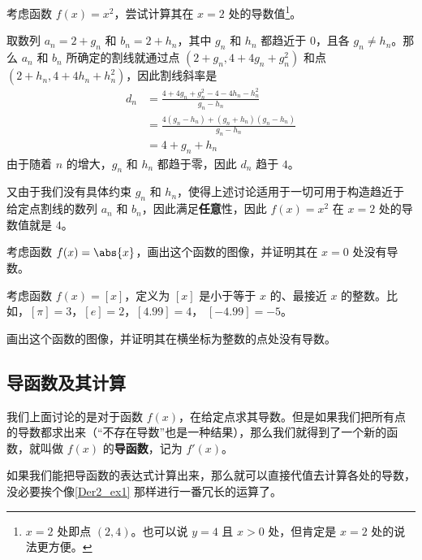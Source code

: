 \begin{example}{}\label{Der2_ex1}
考虑函数 $f(x)=x^2$，尝试计算其在 $x=2$ 处的导数值\footnote{$x=2$ 处即点 $(2, 4)$。也可以说 $y=4$ 且 $x>0$ 处，但肯定是 $x=2$ 处的说法更方便。}。

取数列 $a_n=2+g_n$ 和 $b_n=2+h_n$，其中 $g_n$ 和 $h_n$ 都趋近于 $0$，且各 $g_n\not=h_n$。那么 $a_n$ 和 $b_n$ 所确定的割线就通过点 $(2+g_n, 4+4g_n+g_n^2)$ 和点 $(2+h_n, 4+4h_n+h_n^2)$，因此割线斜率是
\begin{equation}
\begin{aligned}
d_n&=\frac{4+4g_n+g_n^2-4-4h_n-h_n^2}{g_n-h_n}\\
&=\frac{4(g_n-h_n)+(g_n+h_n)(g_n-h_n)}{g_n-h_n}\\
&=4+g_n+h_n
\end{aligned}
\end{equation}
由于随着 $n$ 的增大，$g_n$ 和 $h_n$ 都趋于零，因此 $d_n$ 趋于 $4$。

又由于我们没有具体约束 $g_n$ 和 $h_n$，使得上述讨论适用于一切可用于构造趋近于给定点割线的数列 $a_n$ 和 $b_n$，因此满足\textbf{任意}性，因此 $f(x)=x^2$ 在 $x=2$ 处的导数值就是 $4$。
\end{example}

\begin{exercise}{}
考虑函数 $f(x)=\abs{x}$，画出这个函数的图像，并证明其在 $x=0$ 处没有导数。
\end{exercise}

\begin{exercise}{}\label{Der2_exe1}
考虑函数 $f(x)=[x]$，定义为 $[x]$ 是小于等于 $x$ 的、最接近 $x$ 的整数。比如，$[\pi]=3$，$[e]=2$，$[4.99]=4$， $[-4.99]=-5$。

画出这个函数的图像，并证明其在横坐标为整数的点处没有导数。
\end{exercise}








\subsection{导函数及其计算}

我们上面讨论的是对于函数 $f(x)$，在给定点求其导数。但是如果我们把所有点的导数都求出来（“不存在导数”也是一种结果），那么我们就得到了一个新的函数，就叫做 $f(x)$ 的\textbf{导函数}，记为 $f'(x)$。

如果我们能把导函数的表达式计算出来，那么就可以直接代值去计算各处的导数，没必要挨个像\autoref{Der2_ex1} 那样进行一番冗长的运算了。

